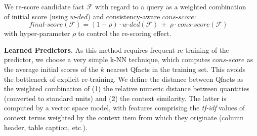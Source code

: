 \vspace{0.1cm}
We re-score candidate fact $\mathcal{F}$
with regard to a query
as a weighted combination of initial 
score 
(using $\textit{w-ded}$)
and consistency-aware $\textit{cons-score}$:
\[\textit{final-score}(\mathcal{F}) = (1 - \rho) \cdot \textit{w-ded}(\mathcal{F})~ + ~ \rho \cdot \textit{cons-score}(\mathcal{F})\]
with hyper-parameter $\rho$ to control the re-scoring effect.

\vspace{0.1cm}
\noindent \textbf{Learned Predictors.} 
As this method requires frequent re-training of
the predictor, we choose a very simple k-NN technique, which computes $\textit{cons-score}$
as the average initial scores
of the $k$ nearest Qfacts in the training set. 
This avoids the bottleneck of explicit re-training. 
We define the distance between Qfacts as the weighted combination of (1) the relative numeric distance between quantities (converted to standard units) and (2) the context similarity. The latter is computed 
by a vector space model, with features comprising
the \textit{tf-idf} values of context terms weighted by the context item
from which they originate (column header, table caption, etc.).

\begin{comment} 
\vspace{0.1cm}
\noindent \textbf{Entity Scoring}. 
Entity results are generated Qquery-Qfact matching scores. Since Qfacts are generated from different tables, many of them could share the same entity. Hence, we assign each entity a score from one of its Qfacts, which is most relevant to the Qquery. The entities are then ranked by their scores to produce the final results (Block 5).
\end{comment}


